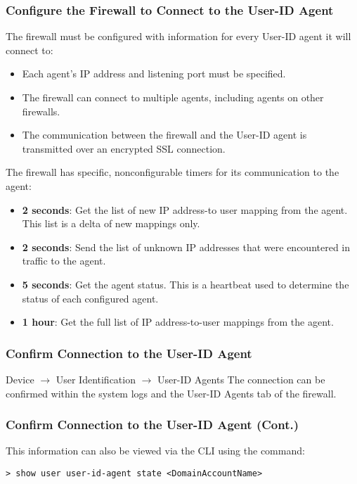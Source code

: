 \subsubsection{Configure the Firewall to Connect to the User-ID Agent}
The firewall must be configured with information for every User-ID agent it will connect to:
\begin{itemize}
    \item Each agent's IP address and listening port must be specified.
    \item The firewall can connect to multiple agents, including agents on other firewalls.
    \item The communication between the firewall and the User-ID agent is transmitted over an encrypted SSL connection.
\end{itemize}
The firewall has specific, nonconfigurable timers for its communication to the agent:
\begin{itemize}
    \item \textbf{2 seconds}: Get the list of new IP address-to user mapping from the agent.
    This list is a delta of new mappings only.
    \item \textbf{2 seconds}: Send the list of unknown IP addresses that were encountered in traffic to the agent.
    \item \textbf{5 seconds}: Get the agent status. This is a heartbeat used to determine the status of each configured agent.
    \item \textbf{1 hour}: Get the full list of IP address-to-user mappings from the agent.
\end{itemize}

\subsubsection{Confirm Connection to the User-ID Agent}
Device $\rightarrow$ User Identification $\rightarrow$ User-ID Agents
\newline The connection can be confirmed within the system logs and the User-ID Agents tab of the firewall.

\subsubsection{Confirm Connection to the User-ID Agent (Cont.)}
This information can also be viewed via the CLI using the command:
\begin{verbatim}
> show user user-id-agent state <DomainAccountName>
\end{verbatim}

